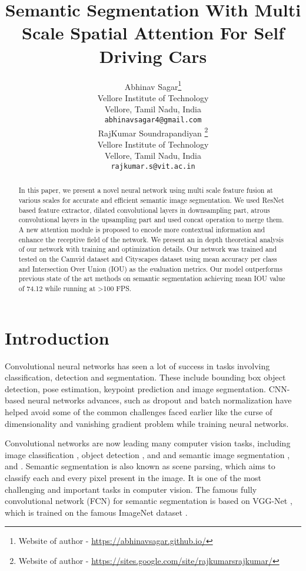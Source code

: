 \documentclass{article}
\title{Semantic Segmentation With Multi Scale Spatial Attention For Self Driving Cars}
\author{Abhinav Sagar\thanks{Website of author - \url{https://abhinavsagar.github.io/}} \\
  Vellore Institute of Technology\\
  Vellore, Tamil Nadu, India\\
  \texttt{abhinavsagar4@gmail.com} \\
\And
RajKumar Soundrapandiyan \thanks{Website of author - \url{https://sites.google.com/site/rajkumarsrajkumar/}} \\
  Vellore Institute of Technology\\
  Vellore, Tamil Nadu, India\\
  \texttt{rajkumar.s@vit.ac.in} \\
}
\begin{document}
\nocite{*}

\maketitle

\begin{abstract}
In this paper, we present a novel neural network using multi scale feature fusion at various scales for accurate and efficient semantic image segmentation. We used ResNet based feature extractor, dilated convolutional layers in downsampling part, atrous convolutional layers in the upsampling part and used concat operation to merge them. A new attention module is proposed to encode more contextual information and enhance the receptive field of the network. We present an in depth theoretical analysis of our network with training and optimization details. Our network was trained and tested on the Camvid dataset and Cityscapes dataset using mean accuracy per class and Intersection Over Union (IOU) as the evaluation metrics. Our model outperforms previous state of the art methods on semantic segmentation achieving mean IOU value of 74.12 while running at >100 FPS.  
\end{abstract}

\section{Introduction}

Convolutional neural  networks has seen a lot of success in tasks involving classification, detection and segmentation. These include  bounding box object detection, pose estimation, keypoint prediction and image segmentation. CNN-based neural networks advances, such as dropout \citep{srivastava2014dropout} and batch normalization \citep{ioffe2015batch} have helped avoid some of the common challenges faced earlier like the curse of dimensionality and vanishing gradient problem while training neural networks. 

Convolutional networks are now leading many computer vision tasks, including image classification \citep{deng2009imagenet}, object detection \citep{girshick2014rich}, \citep{zhu2015segdeepm} and \citep{liu2015multiclass} and semantic image segmentation \citep{chen2014semantic}, \citep{li2014highly} and \citep{zhao2017pyramid}. Semantic segmentation is also known as scene parsing, which aims to classify each and every pixel present in the image. It is one of the most challenging and important  tasks in computer vision. The famous fully convolutional network (FCN) \citep{long2015fully} for semantic segmentation is based on VGG-Net \citep{simonyan2014very}, which is trained on the famous ImageNet dataset \citep{deng2009imagenet}.
\end{document}
